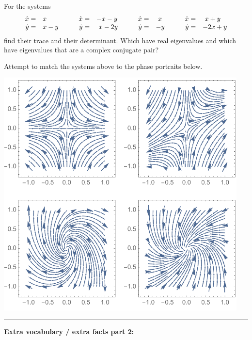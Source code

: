 \documentclass[12pt,letterpaper,noanswers]{exam}
\begin{document}
\begin{questions}
\begin{parts}
For the systems
\[ 
\begin{array}{ r l c r l c r l c r l c}
 \dot{x} =  &x  & \quad & \dot{x} = &-x - y & \quad & \dot{x} = &\ x & \quad & \dot{x} =&\ x + y \\
 \dot{y} = &x- y & \quad & \dot{y} = &\ x - 2y & \quad & \dot{y} = &- y & & \dot{y} = &-2x + y\\
\end{array}\]
find their trace and their determinant.  Which have real eigenvalues and which have eigenvalues that are a complex conjugate pair?

\item Attempt to match the systems above to the phase portraits below.

\includegraphics[width=5in]{img/VectorFields.pdf}
\end{parts}
\end{questions}


\vspace{0.2cm}
\hrule
\vspace{0.2cm}


\noindent \textbf{Extra vocabulary / extra facts part 2:}
\end{document}
